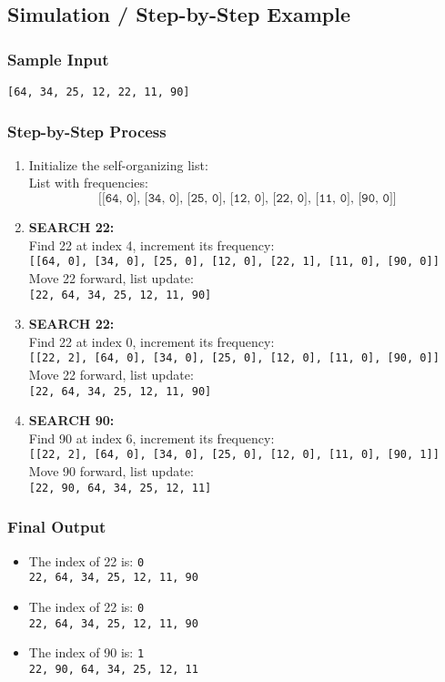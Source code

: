 \documentclass{article}
\begin{document}
\subsection*{Simulation / Step-by-Step Example}
\subsubsection*{Sample Input}
\texttt{[64, 34, 25, 12, 22, 11, 90]}

\subsubsection*{Step-by-Step Process}
\begin{enumerate}
    \item Initialize the self-organizing list: \\
    List with frequencies: 
    \[
    \texttt{[[64, 0], [34, 0], [25, 0], [12, 0], [22, 0], [11, 0], [90, 0]]}
    \]

    \item \textbf{SEARCH 22:} \\
    Find 22 at index 4, increment its frequency: \\
    \texttt{[[64, 0], [34, 0], [25, 0], [12, 0], [22, 1], [11, 0], [90, 0]]} \\
    Move 22 forward, list update: \\
    \texttt{[22, 64, 34, 25, 12, 11, 90]}

    \item \textbf{SEARCH 22:} \\
    Find 22 at index 0, increment its frequency: \\
    \texttt{[[22, 2], [64, 0], [34, 0], [25, 0], [12, 0], [11, 0], [90, 0]]} \\
    Move 22 forward, list update: \\
    \texttt{[22, 64, 34, 25, 12, 11, 90]}

    \item \textbf{SEARCH 90:} \\
    Find 90 at index 6, increment its frequency: \\
    \texttt{[[22, 2], [64, 0], [34, 0], [25, 0], [12, 0], [11, 0], [90, 1]]} \\
    Move 90 forward, list update: \\
    \texttt{[22, 90, 64, 34, 25, 12, 11]}
\end{enumerate}

\subsubsection*{Final Output}
\begin{itemize}
    \item The index of 22 is: \texttt{0} \\
    \texttt{22, 64, 34, 25, 12, 11, 90}
    \item The index of 22 is: \texttt{0} \\
    \texttt{22, 64, 34, 25, 12, 11, 90}
    \item The index of 90 is: \texttt{1} \\
    \texttt{22, 90, 64, 34, 25, 12, 11}
\end{itemize}
\end{document}
